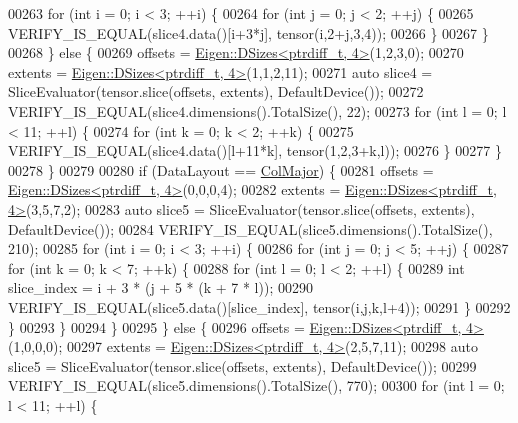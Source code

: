 \begin{DoxyCode}
00263     \textcolor{keywordflow}{for} (\textcolor{keywordtype}{int} i = 0; i < 3; ++i) \{
00264       \textcolor{keywordflow}{for} (\textcolor{keywordtype}{int} j = 0; j < 2; ++j) \{
00265         VERIFY\_IS\_EQUAL(slice4.data()[i+3*j], tensor(i,2+j,3,4));
00266       \}
00267     \}
00268   \} \textcolor{keywordflow}{else} \{
00269     offsets = \hyperlink{struct_eigen_1_1_d_sizes}{Eigen::DSizes<ptrdiff\_t, 4>}(1,2,3,0);
00270     extents = \hyperlink{struct_eigen_1_1_d_sizes}{Eigen::DSizes<ptrdiff\_t, 4>}(1,1,2,11);
00271     \textcolor{keyword}{auto} slice4 = SliceEvaluator(tensor.slice(offsets, extents), DefaultDevice());
00272     VERIFY\_IS\_EQUAL(slice4.dimensions().TotalSize(), 22);
00273     \textcolor{keywordflow}{for} (\textcolor{keywordtype}{int} l = 0; l < 11; ++l) \{
00274       \textcolor{keywordflow}{for} (\textcolor{keywordtype}{int} k = 0; k < 2; ++k) \{
00275         VERIFY\_IS\_EQUAL(slice4.data()[l+11*k], tensor(1,2,3+k,l));
00276       \}
00277     \}
00278   \}
00279 
00280   \textcolor{keywordflow}{if} (DataLayout == \hyperlink{group__enums_ggaacded1a18ae58b0f554751f6cdf9eb13a0cbd4bdd0abcfc0224c5fcb5e4f6669a}{ColMajor}) \{
00281     offsets = \hyperlink{struct_eigen_1_1_d_sizes}{Eigen::DSizes<ptrdiff\_t, 4>}(0,0,0,4);
00282     extents = \hyperlink{struct_eigen_1_1_d_sizes}{Eigen::DSizes<ptrdiff\_t, 4>}(3,5,7,2);
00283     \textcolor{keyword}{auto} slice5 = SliceEvaluator(tensor.slice(offsets, extents), DefaultDevice());
00284     VERIFY\_IS\_EQUAL(slice5.dimensions().TotalSize(), 210);
00285     \textcolor{keywordflow}{for} (\textcolor{keywordtype}{int} i = 0; i < 3; ++i) \{
00286       \textcolor{keywordflow}{for} (\textcolor{keywordtype}{int} j = 0; j < 5; ++j) \{
00287         \textcolor{keywordflow}{for} (\textcolor{keywordtype}{int} k = 0; k < 7; ++k) \{
00288           \textcolor{keywordflow}{for} (\textcolor{keywordtype}{int} l = 0; l < 2; ++l) \{
00289             \textcolor{keywordtype}{int} slice\_index = i + 3 * (j + 5 * (k + 7 * l));
00290             VERIFY\_IS\_EQUAL(slice5.data()[slice\_index], tensor(i,j,k,l+4));
00291           \}
00292         \}
00293       \}
00294     \}
00295   \} \textcolor{keywordflow}{else} \{
00296     offsets = \hyperlink{struct_eigen_1_1_d_sizes}{Eigen::DSizes<ptrdiff\_t, 4>}(1,0,0,0);
00297     extents = \hyperlink{struct_eigen_1_1_d_sizes}{Eigen::DSizes<ptrdiff\_t, 4>}(2,5,7,11);
00298     \textcolor{keyword}{auto} slice5 = SliceEvaluator(tensor.slice(offsets, extents), DefaultDevice());
00299     VERIFY\_IS\_EQUAL(slice5.dimensions().TotalSize(), 770);
00300     \textcolor{keywordflow}{for} (\textcolor{keywordtype}{int} l = 0; l < 11; ++l) \{

\end{DoxyCode}

